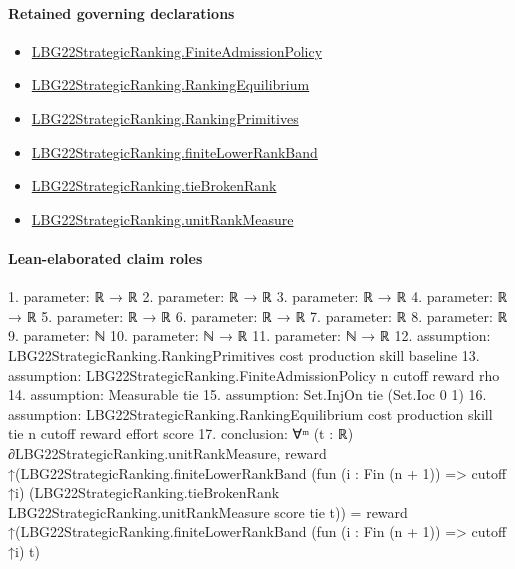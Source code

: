 \documentclass[10pt]{article}
\begin{document}
\paragraph{Retained governing declarations}
\begin{itemize}\raggedright
\item \hyperlink{paper-prerequisite-d056dd7c8060653c}{LBG22\allowbreak{}Strategic\allowbreak{}Ranking.\allowbreak{}Finite\allowbreak{}Admission\allowbreak{}Policy}
\item \hyperlink{paper-prerequisite-2a1b692f4e3136c6}{LBG22\allowbreak{}Strategic\allowbreak{}Ranking.\allowbreak{}Ranking\allowbreak{}Equilibrium}
\item \hyperlink{paper-prerequisite-9bbcc12f4a1736bf}{LBG22\allowbreak{}Strategic\allowbreak{}Ranking.\allowbreak{}Ranking\allowbreak{}Primitives}
\item \hyperlink{paper-prerequisite-a42f440ddc254fa7}{LBG22\allowbreak{}Strategic\allowbreak{}Ranking.\allowbreak{}finite\allowbreak{}Lower\allowbreak{}Rank\allowbreak{}Band}
\item \hyperlink{paper-prerequisite-b7c71e53177b76c6}{LBG22\allowbreak{}Strategic\allowbreak{}Ranking.\allowbreak{}tie\allowbreak{}Broken\allowbreak{}Rank}
\item \hyperlink{governing-declaration-678cf48d549cb620}{LBG22\allowbreak{}Strategic\allowbreak{}Ranking.\allowbreak{}unit\allowbreak{}Rank\allowbreak{}Measure}
\end{itemize}
\paragraph{Lean-elaborated claim roles}\begin{ReviewVerbatim}
1. parameter: ℝ → ℝ
2. parameter: ℝ → ℝ
3. parameter: ℝ → ℝ
4. parameter: ℝ → ℝ
5. parameter: ℝ → ℝ
6. parameter: ℝ → ℝ
7. parameter: ℝ
8. parameter: ℝ
9. parameter: ℕ
10. parameter: ℕ → ℝ
11. parameter: ℕ → ℝ
12. assumption: LBG22StrategicRanking.RankingPrimitives cost production skill baseline
13. assumption: LBG22StrategicRanking.FiniteAdmissionPolicy n cutoff reward rho
14. assumption: Measurable tie
15. assumption: Set.InjOn tie (Set.Ioc 0 1)
16. assumption: LBG22StrategicRanking.RankingEquilibrium cost production skill tie n cutoff reward effort score
17. conclusion: ∀ᵐ (t : ℝ) ∂LBG22StrategicRanking.unitRankMeasure,
  reward
      ↑(LBG22StrategicRanking.finiteLowerRankBand (fun (i : Fin (n + 1)) => cutoff ↑i)
          (LBG22StrategicRanking.tieBrokenRank LBG22StrategicRanking.unitRankMeasure score tie t)) =
    reward ↑(LBG22StrategicRanking.finiteLowerRankBand (fun (i : Fin (n + 1)) => cutoff ↑i) t)
\end{ReviewVerbatim}
\end{document}
